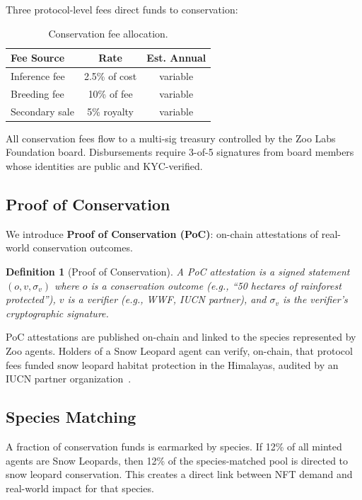 \documentclass[11pt,letterpaper]{article}
\newtheorem{definition}{Definition}[section]
\begin{document}
Three protocol-level fees direct funds to conservation:

\begin{table}[t]
\centering
\begin{tabular}{lcc}
\toprule
\textbf{Fee Source} & \textbf{Rate} & \textbf{Est. Annual} \\
\midrule
Inference fee & 2.5\% of cost & variable \\
Breeding fee & 10\% of fee & variable \\
Secondary sale & 5\% royalty & variable \\
\bottomrule
\end{tabular}
\caption{Conservation fee allocation.}
\label{tab:conservation-fees}
\end{table}

All conservation fees flow to a multi-sig treasury controlled by the Zoo Labs Foundation board. Disbursements require 3-of-5 signatures from board members whose identities are public and KYC-verified.

\subsection{Proof of Conservation}

We introduce \textbf{Proof of Conservation (PoC)}: on-chain attestations of real-world conservation outcomes.

\begin{definition}[Proof of Conservation]
A PoC attestation is a signed statement $(o, v, \sigma_v)$ where $o$ is a conservation outcome (e.g., ``50 hectares of rainforest protected''), $v$ is a verifier (e.g., WWF, IUCN partner), and $\sigma_v$ is the verifier's cryptographic signature.
\end{definition}

PoC attestations are published on-chain and linked to the species represented by Zoo agents. Holders of a Snow Leopard agent can verify, on-chain, that protocol fees funded snow leopard habitat protection in the Himalayas, audited by an IUCN partner organization~\cite{iucn}.

\subsection{Species Matching}

A fraction of conservation funds is earmarked by species. If 12\% of all minted agents are Snow Leopards, then 12\% of the species-matched pool is directed to snow leopard conservation. This creates a direct link between NFT demand and real-world impact for that species.
\end{document}
